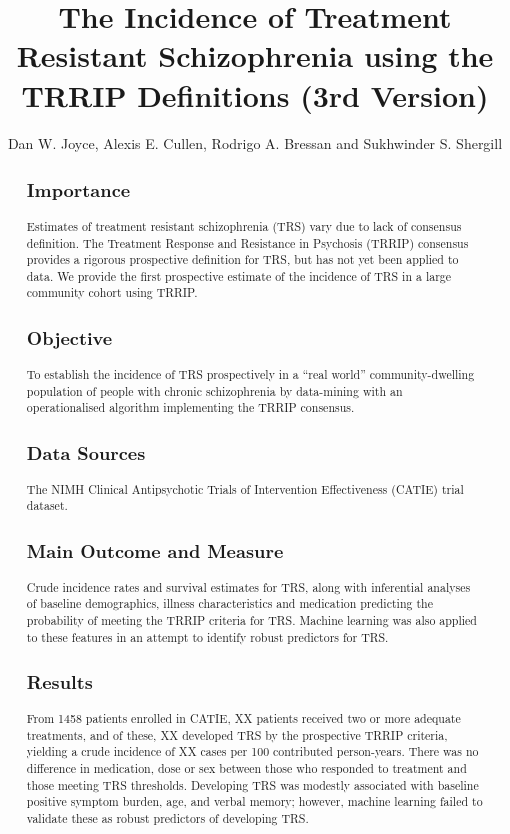 \documentclass[a4paper,nobib]{article}
\title{The Incidence of Treatment Resistant Schizophrenia using the TRRIP Definitions (3rd Version)}
\author{Dan W. Joyce, Alexis E. Cullen, Rodrigo A. Bressan and Sukhwinder S. Shergill}
\begin{document}
\maketitle

\begin{abstract}
\subsection*{Importance}
Estimates of treatment resistant schizophrenia (TRS) vary due to lack of consensus definition.  The Treatment Response and Resistance in Psychosis (TRRIP) consensus provides a rigorous prospective definition for TRS, but has not yet been applied to data.  We provide the first prospective estimate of the incidence of TRS in a large community cohort using TRRIP.
\subsection*{Objective}
To establish the incidence of TRS prospectively in a ``real world'' community-dwelling population of people with chronic schizophrenia by data-mining with an operationalised algorithm implementing the TRRIP consensus. 
\subsection*{Data Sources}
The NIMH Clinical Antipsychotic Trials of Intervention Effectiveness (CATIE) trial dataset.
\subsection*{Main Outcome and Measure}
Crude incidence rates and survival estimates for TRS, along with inferential analyses of baseline demographics, illness characteristics and medication predicting the probability of meeting the TRRIP criteria for TRS.  Machine learning was also applied to these features in an attempt to identify robust predictors for TRS.   
\subsection*{Results}
From 1458 patients enrolled in CATIE, XX patients received two or more adequate treatments, and of these, XX developed TRS by the prospective TRRIP criteria, yielding a crude incidence of XX cases per 100 contributed person-years. There was no difference in medication, dose or sex between those who responded to treatment and those meeting TRS thresholds. Developing TRS was modestly associated with baseline positive symptom burden, age, and verbal memory; however, machine learning failed to validate these as robust predictors of developing TRS.


\end{abstract}
\end{document}
